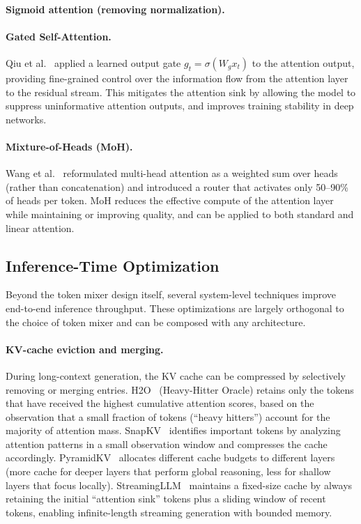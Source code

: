 \documentclass[11pt,a4paper]{article}
\begin{document}
\paragraph{Sigmoid attention (removing normalization).}
\paragraph{Gated Self-Attention.}
Qiu et al.~\cite{qiu2025gated} applied a learned output gate $g_t = \sigma(W_g x_t)$ to the attention output, providing fine-grained control over the information flow from the attention layer to the residual stream. This mitigates the attention sink by allowing the model to suppress uninformative attention outputs, and improves training stability in deep networks.

\paragraph{Mixture-of-Heads (MoH).}
Wang et al.~\cite{wang2024moh} reformulated multi-head attention as a weighted sum over heads (rather than concatenation) and introduced a router that activates only 50--90\% of heads per token. MoH reduces the effective compute of the attention layer while maintaining or improving quality, and can be applied to both standard and linear attention.


\subsection{Inference-Time Optimization}
\label{subsec:inference-opt}

Beyond the token mixer design itself, several system-level techniques improve end-to-end inference throughput. These optimizations are largely orthogonal to the choice of token mixer and can be composed with any architecture.

\paragraph{KV-cache eviction and merging.}
During long-context generation, the KV cache can be compressed by selectively removing or merging entries. H2O~\cite{zhang2023h2o} (Heavy-Hitter Oracle) retains only the tokens that have received the highest cumulative attention scores, based on the observation that a small fraction of tokens (``heavy hitters'') account for the majority of attention mass. SnapKV~\cite{li2024snapkv} identifies important tokens by analyzing attention patterns in a small observation window and compresses the cache accordingly. PyramidKV~\cite{cai2024pyramidkv} allocates different cache budgets to different layers (more cache for deeper layers that perform global reasoning, less for shallow layers that focus locally). StreamingLLM~\cite{xiao2023streamingllm} maintains a fixed-size cache by always retaining the initial ``attention sink'' tokens plus a sliding window of recent tokens, enabling infinite-length streaming generation with bounded memory.
\end{document}
